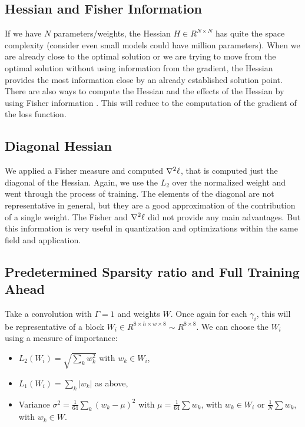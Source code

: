 \documentclass[conference]{IEEEtran}
\begin{document}
\subsection{Hessian and Fisher Information}
If we have $N$ parameters/weights, the Hessian $H \in R^{N\times N}$
has quite the space complexity (consider even small models could have
million parameters). When we are already close to the optimal solution
or we are trying to move from the optimal solution without using
information from the gradient, the Hessian provides the most
information close by an already established solution point. There are
also ways to compute the Hessian and the effects of the Hessian by
using Fisher information
\cite{yao2020adahessian,abs-2101-08940,zandonati2022fit}. This will
reduce to the computation of the gradient of the loss function.



\subsection{Diagonal Hessian}
We applied a Fisher measure and computed $\nabla^2{\bf \ell}$, that is
computed just the diagonal of the Hessian. Again, we use the $L_2$
over the normalized weight and went through the process of
training. The elements of the diagonal are not representative in
general, but they are a good approximation of the contribution of a
single weight.  The Fisher and $\nabla^2{\bf \ell}$ did not provide
any main advantages. But this information is very useful in
quantization and optimizations within the same field and application.



\subsection{Predetermined Sparsity ratio and Full Training Ahead}

Take a convolution with $\Gamma = 1$ and weights $W$. Once again for each
$\gamma_i$, this will be representative of a block $W_{i} \in R^{8
  \times h \times w \times 8} \sim R^{8\times 8}$. We can choose the
$W_{i}$ using a measure of importance:

\begin{itemize}
  \item $L_{2}(W_{i}) = \sqrt{\sum_k w_k^2}$ with $w_{k} \in W_{i}$,
  \item $L_{1}(W_{i}) = \sum_k |w_{k}|$ as above,
  \item Variance $\sigma^2 = \frac{1}{64}\sum_{k} (w_{k} -\mu)^2$ with
    $\mu = \frac{1}{64}\sum w_{k}$, with $w_{k} \in W_{i} $ or $\frac{1}{N}\sum
    w_{k}$, with $w_{k} \in W$. 
\end{itemize}
\end{document}
